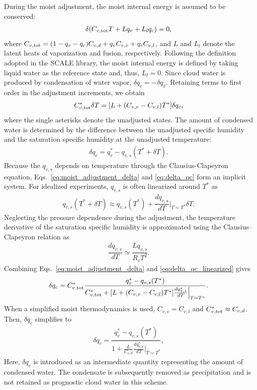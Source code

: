 During the moist adjustment, 
the moist internal energy is assumed to be conserved:
\begin{align}
 \delta ( C_{v,{\rm tot}} T + L q_v + L_l q_c ) = 0,
\end{align}
where $C_{v,{\rm tot}} = (1-q_v- q_c) C_{v,d} + q_v C_{v,v} + q_c C_{v,l}$, 
and $L$ and $L_l$ denote the latent heats of vaporization and fusion, respectively.
Following the definition adopted in the SCALE library, 
the moist internal energy is defined by taking liquid water as the reference state and, thus, $L_l=0$.
Since cloud water is produced by condensation of water vapor, 
$\delta q_c=-\delta q_v$. 
Retaining terms to first order in the adjustment increments, 
we obtain
\begin{align}
C^*_{v,{\rm tot}} \delta T = [L + (C_{v,v} - C_{v,l})T^*]\delta q_c,
\label{eq:moist_adjustment_delta}
\end{align}
where the single asterisks denote the unadjusted states.
The amount of condensed water is determined by the difference between the unadjusted specific humidity and the saturation specific humidity at the unadjusted temperature:
\begin{align}
\delta q_c = q_v^* - q_{v,s}(T^* + \delta T).
\label{eq:delta_qc}
\end{align}
Because the $q_{v,s}$ depends on temperature through the Clausius-Clapeyron equation, 
Eqs.~\eqref{eq:moist_adjustment_delta} and \eqref{eq:delta_qc} form an implicit system.
For idealized experiments, $q_{v,s}$ is often linearized around $T^*$ as
\begin{align}
  q_{v,s}(T^*+\delta T) \approx q_{v,s}(T^*) + \dfrac{dq_{v,s}}{dT}\Big|_{T=T^*} \delta T.
\label{eq:delta_qc_linearized}
\end{align}
Neglecting the pressure dependence during the adjustment,
the temperature derivative of the saturation specific humidity is approximated using the Clausius--Clapeyron relation as
\begin{align*}
  \dfrac{dq_{v,s}}{dT} \simeq \dfrac{L q_{v,s}}{R_v T^2}.
\end{align*}
Combining Eqs.~\eqref{eq:moist_adjustment_delta} and \eqref{eq:delta_qc_linearized} gives
\begin{align}
 \delta q_c = C^*_{v,{\rm tot}} \dfrac{q_v^* -q_{v,s}(T^*)}{C^*_{v,{\rm tot}} + [L + (C_{v,v}-C_{v,l})T^*] \frac{dq_{v,s}^*}{dT}\Big|_{T=T^*}}.
\end{align}
When a simplified moist thermodynamics is used, 
$C_{v,v}=C_{v,l}$ and $C^*_{v,{\rm tot}} \approx C_{v,d}$.
Then, $\delta q_c$ simplifies to
\begin{align}
  \delta q_c = \dfrac{q_v^* - q_{v,s}(T^*)}{1 + \frac{L}{C_{v,d}} \frac{dq_{v,s}^*}{dT}\Big|_{T=T^*}}, 
\end{align}
Here, $\delta q_c$ is introduced as an intermediate quantity representing the amount of condensed water.
The condensate is subsequently removed as precipitation and is not retained as prognostic cloud water in this scheme.

